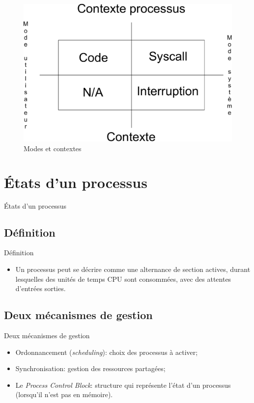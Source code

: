 \begin{frame}{\sectitle}
\begin{figure}
\includegraphics[width=.9\textwidth]{images/ContextMode.pdf}
\caption{Modes et contextes}
\end{figure}
\end{frame}

\def\sectitle{États d'un processus}
\section{\sectitle}

\begin{frame}{\sectitle}

\def\subsectitle{Définition}
\subsection{\subsectitle}

\begin{exampleblock}{\subsectitle}
\begin{itemize}
    \item Un processus peut se décrire comme une alternance de section actives,
    durant lesquelles des unités de temps CPU sont consommées, avec des attentes
    d'entrées sorties.
\end{itemize}
\end{exampleblock}

\def\subsectitle{Deux mécanismes de gestion}
\subsection{\subsectitle}

\begin{block}{\subsectitle}
\begin{itemize}
    \item Ordonnancement (\textit{scheduling}): choix des processus à activer;
    \item Synchronisation: gestion des ressources partagées;
    \item Le \textit{Process Control Block}: structure qui représente l'état
    d'un processus (lorsqu'il n'est pas en mémoire).
\end{itemize}
\end{block}

\end{frame}




